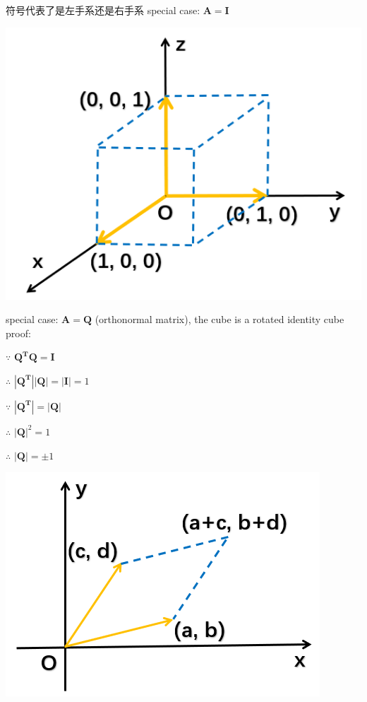 \documentclass[12pt, a4paper]{article}
\begin{document}
{\qquad
符号代表了是左手系还是右手系
\vspace{14pt}
\newline
special case: ${\mathbf{A}} = {\mathbf{I}}$
\begin{center}
	\includegraphics[scale=0.4]{figures/S20-2.png}
\end{center}
\vspace{14pt}
special case: ${\mathbf{A}} = {\mathbf{Q}}$ (orthonormal matrix), the cube is a rotated identity cube
\newline
proof:
\par $\because$ ${\mathbf{Q^{T}}}{\mathbf{Q}} = {\mathbf{I}}$
\par $\therefore$ $\left|{\mathbf{Q^{T}}}\right|\left|{\mathbf{Q}}\right| = \left|{\mathbf{I}}\right| = 1$
\par $\because$ $\left|{\mathbf{Q^{T}}}\right| = \left|{\mathbf{Q}}\right|$
\par $\therefore$ $\left|{\mathbf{Q}}\right|^{2} = 1$
\par $\therefore$ $\left|{\mathbf{Q}}\right| = \pm 1$
\vspace{14pt}
\begin{center}
	\includegraphics[scale=0.7]{figures/S20-3.png}

\end{center}}
\end{document}
